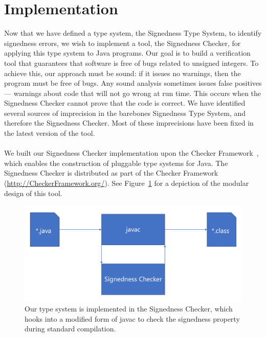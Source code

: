 \newpage
\section{Implementation} \label{imp}

Now that we have defined a type system, the Signedness Type System, to identify
signedness errors, we wish to implement a tool, the Signedness Checker,
for applying this type system
to Java programs.
Our goal is to build a verification tool that guarantees that software is
free of bugs related to unsigned integers. To achieve this, our approach
must be sound:  if it issues no warnings, then the program must be free of
bugs.
Any sound analysis sometimes issues false positives --- warnings about
code that will not go wrong at run time.  This occurs when the
Signedness Checker cannot prove that the code is correct. We have identified
several sources of imprecision in the barebones Signedness Type System,
and therefore the
Signedness Checker. Most of these imprecisions have been fixed in the latest
version of the tool.\\
\\
We built our Signedness Checker implementation upon the
Checker Framework~\cite{PapiACPE2008,DietlDEMS2011}, which enables the
construction of pluggable type systems for Java.
The Signedness Checker is distributed as part of the Checker Framework
(\url{http://CheckerFramework.org/}). See Figure~\ref{fig:system} for a
depiction of the modular design of this tool.

\begin{figure}[t]
\centering
\includegraphics[scale=0.5]{signedness-system}
\vspace{-10pt}
\caption{Our type system is implemented in the Signedness Checker, which
hooks into a modified form of javac to check the signedness property during
standard compilation.}
\label{fig:system}
\end{figure}

